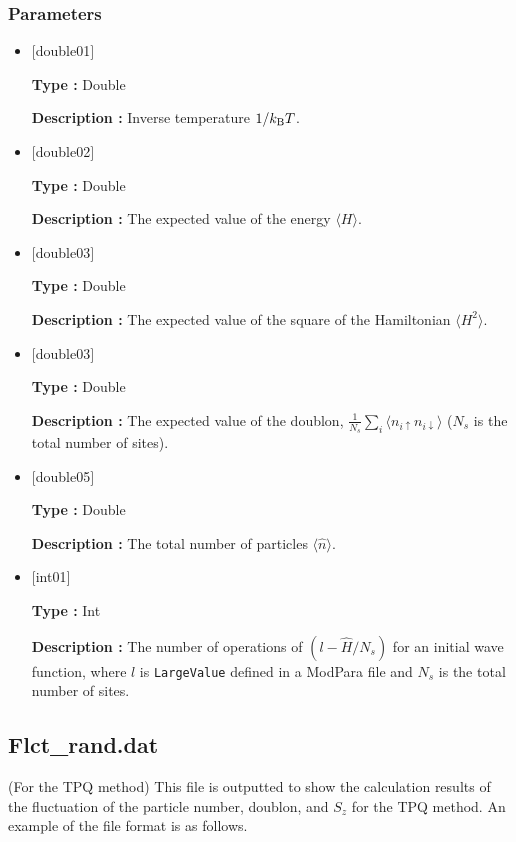 \subsubsection{Parameters}
 \begin{itemize}

  \item  $[$double01$]$
  
 {\bf Type :} Double

{\bf Description :} Inverse temperature $1/{k_{\rm B}T}$.
 
  \item $[$double02$]$

 {\bf Type :} Double 

{\bf Description :}  The expected value of the energy $\langle H \rangle$.

  \item $[$double03$]$

 {\bf Type :} Double 

{\bf Description :} The expected value of the square of the Hamiltonian $\langle H^2 \rangle$. 

  \item $[$double03$]$

 {\bf Type :} Double 

{\bf Description :} The expected value of the doublon, 
$\frac{1}{N_s} \sum_{i}\langle n_{i\uparrow}n_{i\downarrow}\rangle$ ($N_{s}$ is the total number of sites).

  \item $[$double05$]$

 {\bf Type :} Double 

{\bf Description :} The total number of particles $\langle {\hat n} \rangle$.


  \item $[$int01$]$

 {\bf Type :} Int 

{\bf Description :} The number of operations of $(l-\hat{H}/N_{s})$ for an initial wave function, where $l$ is \verb|LargeValue| defined in a ModPara file and $N_{s}$ is the total number of sites.

 \end{itemize}

\newpage
\subsection{Flct\_rand.dat}
\label{Subsec:flctrand}
(For the TPQ method) This file is outputted to show the calculation results of the fluctuation of the particle number, doublon, and $S_z$ for the TPQ method.
An example of the file format is as follows.\\


